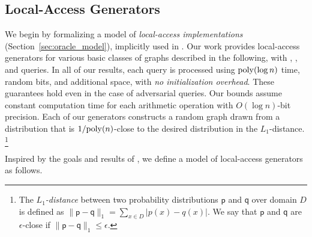 \subsection{Local-Access Generators}
We begin by formalizing a model of \emph{local-access implementations} (Section~\ref{sec:oracle_model}), implicitly used in \cite{reut}.
Our work provides local-access generators for various basic classes of graphs described in the following, with 
, , and  queries.
In all of our results, each query is processed using $\mathrm{poly}(\log n)$ time, random bits, and additional space, with \emph{no initialization overhead}.
These guarantees hold even in the case of adversarial queries.
Our bounds assume constant computation time for each arithmetic operation with $O(\log n)$-bit precision.
Each of our generators constructs a random graph drawn from a distribution that is $1/\mathrm{poly}(n)$-close to the desired distribution in the $L_1$-distance.
\footnote{The \emph{$L_1$-distance} between two probability distributions $\mathsf{p}$ and $\mathsf{q}$ over domain $D$
is defined as $\|\mathsf{p-q}\|_1 = \sum_{x \in D } |p(x)-q(x)|$.
We say that $\mathsf{p}$ and $\mathsf{q}$ are $\epsilon$-close if $\|\mathsf{p-q}\|_1 \leq \epsilon$.}

Inspired by the goals and results of \cite{reut}, we define a model of local-access generators as follows.

